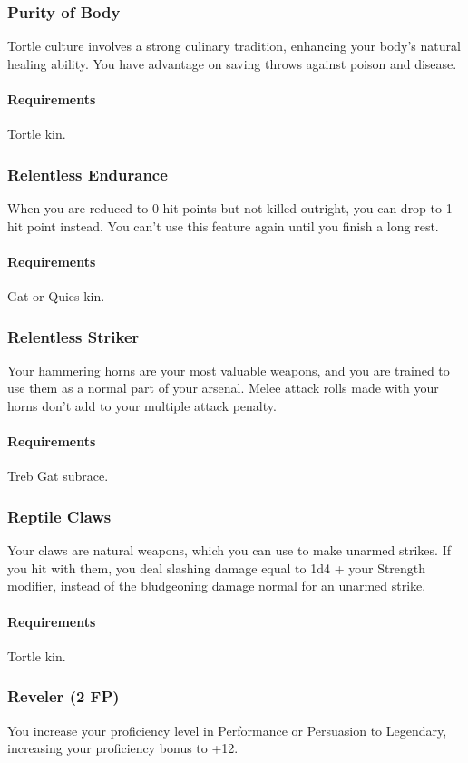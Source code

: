 \subsubsection{Purity of Body} \label{feat::purityofbody}
    Tortle culture involves a strong culinary tradition, enhancing your body's natural healing ability.
    You have advantage on saving throws against poison and disease.
    \paragraph{Requirements} Tortle kin.
\subsubsection{Relentless Endurance} \label{feat::relentlessendurance}
    When you are reduced to 0 hit points but not killed outright, you can drop to 1 hit point instead.
    You can't use this feature again until you finish a long rest.
    \paragraph{Requirements} Gat or Quies kin.
\subsubsection{Relentless Striker} \label{feat::relentlessstriker}
    Your hammering horns are your most valuable weapons, and you are trained to use them as a normal part of your arsenal.
    Melee attack rolls made with your horns don't add to your multiple attack penalty.
    \paragraph{Requirements} Treb Gat subrace.
\subsubsection{Reptile Claws} \label{feat::reptileclaws}
    Your claws are natural weapons, which you can use to make unarmed strikes.
    If you hit with them, you deal slashing damage equal to 1d4 + your Strength modifier, instead of the bludgeoning damage normal for an unarmed strike.
    \paragraph{Requirements} Tortle kin.
\subsubsection{Reveler (2 FP)} \label{feat::reveler}
    You increase your proficiency level in Performance or Persuasion to Legendary, increasing your proficiency bonus to +12.
